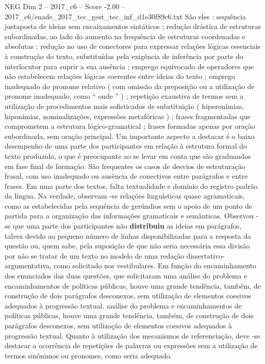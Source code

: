 \begin{textsample}{NEG Dim 2 – 2017\_c6 – Score -2.00 – 2017\_c6/enade\_2017\_tec\_gest\_tec\_inf\_d1e30f89c6.txt}
São eles : sequência justaposta de ideias sem encaixamentos sintáticos ; redução drástica de estruturas subordinadas, ao lado do aumento na frequência de estruturas coordenadas e absolutas ; redução no uso de conectores para expressar relações lógicas essenciais à construção do texto, substituídas pela exigência de inferência por parte do interlocutor para suprir a sua ausência ; emprego equivocado de operadores que não estabelecem relações lógicas coerentes entre ideias do texto ; emprego inadequado do pronome relativo ( com omissão da preposição ou a utilização de pronome inadequado, como “ onde ” ) ; repetição exaustiva de termos sem a utilização de procedimentos mais sofisticados de substituição ( hiperonímias, hiponímias, nominalizações, expressões metafóricas ) ; frases fragmentadas que comprometem a estrutura lógico-gramatical ; frases formadas apenas por oração subordinada, sem oração principal.
Um importante aspecto a destacar é o baixo desempenho de uma parte dos participantes em relação à estrutura formal do texto produzido, o que é preocupante ao se levar em conta que são graduandos em fase final de formação.
São frequentes os casos de desvios de estruturação frasal, com uso inadequado ou ausência de conectivos entre parágrafos e entre frases.
Em uma parte dos textos, falta textualidade e domínio do registro padrão da língua.
Na verdade, observam -se relações linguísticas quase agramaticais, como as estabelecidas pela sequência de gerúndios sem o apoio de um ponto de partida para a organização das informações gramaticais e semânticas.
Observou -se que uma parte dos participantes não \textbf{distribuiu} as ideias em parágrafos, talvez devido ao pequeno número de linhas disponibilizadas para a resposta da questão ou, quem sabe, pela suposição de que não seria necessária essa divisão por não se tratar de um texto no modelo de uma redação dissertativo-argumentativa, como solicitado nos vestibulares.
Em função do encaminhamento dos enunciados das duas questões, que solicitaram uma análise do problema e encaminhamentos de políticas públicas, houve uma grande tendência, também, de construção de dois parágrafos desconexos, sem utilização de elementos coesivos adequados à progressão textual. análise do problema e encaminhamentos de políticas públicas, houve uma grande tendência, também, de construção de dois parágrafos desconexos, sem utilização de elementos coesivos adequados à progressão textual.
Quanto à utilização dos mecanismos de referenciação, deve -se destacar a ocorrência de repetições de palavras ou expressões sem a utilização de termos sinônimos ou pronomes, como seria adequado.

\end{textsample}
